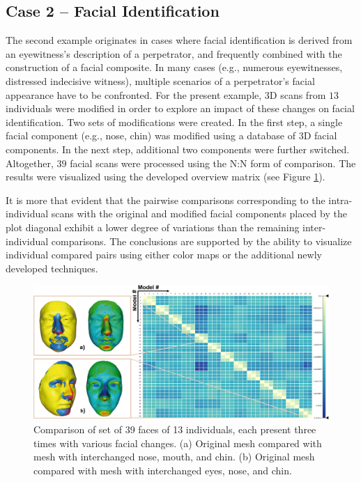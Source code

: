 \documentclass[final,5p,times]{elsarticle}
\begin{document}
\subsection{Case 2 -- Facial Identification}
The second example originates in cases where facial identification is derived from an eyewitness's description of a perpetrator, and frequently combined with the construction of a facial composite. 
In many cases (e.g., numerous eyewitnesses, distressed indecisive witness), multiple scenarios of a perpetrator's facial appearance have to be confronted. For the present example, 3D scans from $13$ individuals were modified in order to explore an impact of these changes on facial identification. 
Two sets of modifications were created. 
In the first step, a single facial component (e.g., nose, chin) was modified using a database of 3D facial components. 
In the next step, additional two components were further switched. 
Altogether, $39$ facial scans were processed using the N:N form of comparison. 
The results were visualized using the developed overview matrix (see Figure \ref{fig:case2}).

It is more that evident that the pairwise comparisons corresponding to the intra-individual scans with the original and modified facial components placed by the plot diagonal exhibit a lower degree of variations than the remaining inter-individual comparisons.
The conclusions are supported by the ability to visualize individual compared pairs using either color maps or the additional newly developed techniques. 

\begin{figure}[htb]
	\centering
  \includegraphics[width=1\linewidth]{pictures/case2a.png}
  \caption{\label{fig:case2}Comparison of set of 39 faces of 13 individuals, each present three times with various facial changes. (a) Original mesh compared with mesh with interchanged nose, mouth, and chin. (b) Original mesh compared with mesh with interchanged eyes, nose, and chin.}
\end{figure}
\end{document}
